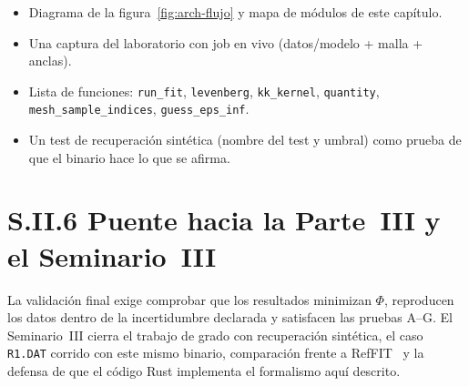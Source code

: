 \begin{itemize}[leftmargin=*]
\item Diagrama de la figura~\ref{fig:arch-flujo} y mapa de m\'odulos de este cap\'itulo.
\item Una captura del laboratorio con job en vivo (datos/modelo + malla + anclas).
\item Lista de funciones: \texttt{run\_fit}, \texttt{levenberg}, \texttt{kk\_kernel}, \texttt{quantity}, \texttt{mesh\_sample\_indices}, \texttt{guess\_eps\_inf}.
\item Un test de recuperaci\'on sint\'etica (nombre del test y umbral) como prueba de que el binario hace lo que se afirma.
\end{itemize}

\section*{S.II.6 Puente hacia la Parte~III y el Seminario~III}

La validaci\'on final exige comprobar que los resultados minimizan $\Phi$, reproducen los datos dentro de la incertidumbre declarada y satisfacen las pruebas A--G.
El Seminario~III cierra el trabajo de grado con recuperaci\'on sint\'etica, el caso \texttt{R1.DAT} corrido con este mismo binario, comparaci\'on frente a RefFIT~\cite{guide} y la defensa de que el c\'odigo Rust implementa el formalismo aqu\'i descrito.

